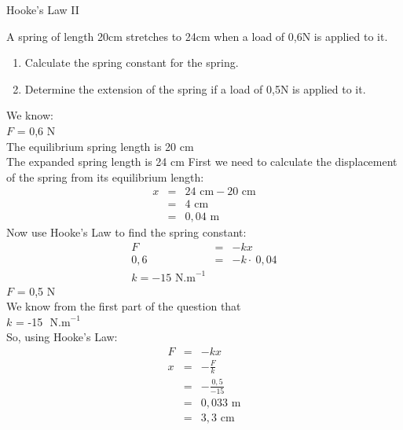 \begin{wex}{Hooke's Law II}{
A spring of length 20cm stretches to 24cm when a load of 0,6N is applied to it.
\begin{minipage}{\textwidth}
\begin{enumerate}
\item Calculate the spring constant for the spring.
\item Determine the extension of the spring if a load of 0,5N is applied to it.
\end{enumerate}
\end{minipage}
}{
We know: \\
$F$ = 0,6 N \\
The equilibrium spring length is 20 cm \\
The expanded spring length is 24 cm 
First we need to calculate the displacement of the spring from its equilibrium length: \\
\begin{eqnarray*}
x & = & 24 \textrm{ cm} - 20 \textrm{ cm}\\
& = & 4 \textrm{ cm}\\
& = & 0,04 \textrm{ m}
\end{eqnarray*}
Now use Hooke's Law to find the spring constant: \\
\begin{eqnarray*}
F & = & -kx \\
0,6 & = & -k \cdot \: 0,04\\
k = -15  \textrm{ N.m}^{-1}
\end{eqnarray*}
$F$ = 0,5 N \\
We know from the first part of the question that \\
$k$ = -15 $\textrm{ N.m}^{-1}$ \\

So, using Hooke's Law: \\

\begin{eqnarray*}
F & = & -kx \\
x & = & -\frac{F}{k} \\
& = & -\frac{0,5}{-15}\\
& = & 0,033 \textrm{ m}\\
& = & 3,3 \textrm{ cm}\\
\end{eqnarray*}
}
\end{wex}


